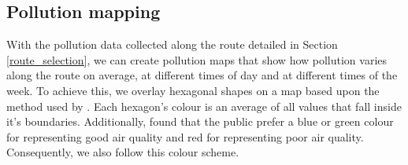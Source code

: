 \documentclass[11pt]{report}
\begin{document}






\subsection{Pollution mapping}

With the pollution data collected along the route detailed in Section \ref{route_selection}, we can create pollution maps that show how pollution varies along the route on average, at different times of day and at different times of the week. To achieve this, we overlay hexagonal shapes on a map based upon the method used by \cite{Hoang2013hanoihexagons}. Each hexagon's colour is an average of all values that fall inside it's boundaries. Additionally, \cite{smallbone2012customerinsight} found that the public prefer a blue or green colour for representing good air quality and red for representing poor air quality. Consequently, we also follow this colour scheme.
\end{document}
